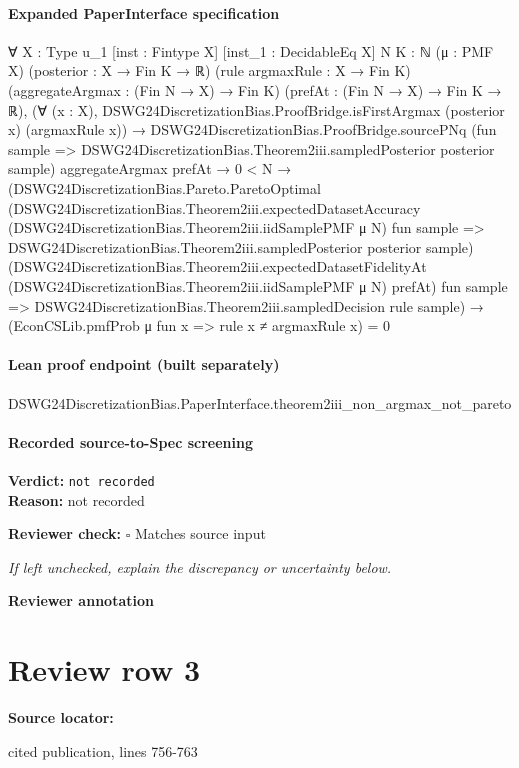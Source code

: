\documentclass[10pt]{article}
\newcommand{\reviewerbox}{%
  \par\noindent\fbox{\parbox{0.96\linewidth}{\rule{0pt}{0.38in}}}\par
}
\newcommand{\reviewmatch}[1]{%
  \par\noindent\textbf{Reviewer check:} $\square$\; #1\par
  \noindent\emph{If left unchecked, explain the discrepancy or uncertainty below.}\par
}
\begin{document}
\paragraph{Expanded PaperInterface specification}
\begin{ReviewVerbatim}
∀ {X : Type u_1} [inst : Fintype X] [inst_1 : DecidableEq X] {N K : ℕ} (μ : PMF X) (posterior : X → Fin K → ℝ)
  (rule argmaxRule : X → Fin K) (aggregateArgmax : (Fin N → X) → Fin K) (prefAt : (Fin N → X) → Fin K → ℝ),
  (∀ (x : X), DSWG24DiscretizationBias.ProofBridge.isFirstArgmax (posterior x) (argmaxRule x)) →
    DSWG24DiscretizationBias.ProofBridge.sourcePNq
        (fun sample => DSWG24DiscretizationBias.Theorem2iii.sampledPosterior posterior sample) aggregateArgmax prefAt →
      0 < N →
        (DSWG24DiscretizationBias.Pareto.ParetoOptimal
            (DSWG24DiscretizationBias.Theorem2iii.expectedDatasetAccuracy
              (DSWG24DiscretizationBias.Theorem2iii.iidSamplePMF μ N) fun sample =>
              DSWG24DiscretizationBias.Theorem2iii.sampledPosterior posterior sample)
            (DSWG24DiscretizationBias.Theorem2iii.expectedDatasetFidelityAt
              (DSWG24DiscretizationBias.Theorem2iii.iidSamplePMF μ N) prefAt)
            fun sample => DSWG24DiscretizationBias.Theorem2iii.sampledDecision rule sample) →
          (EconCSLib.pmfProb μ fun x => rule x ≠ argmaxRule x) = 0
\end{ReviewVerbatim}

\paragraph{Lean proof endpoint (built separately)}\begin{ReviewVerbatim}
DSWG24DiscretizationBias.PaperInterface.theorem2iii_non_argmax_not_pareto
\end{ReviewVerbatim}

\paragraph{Recorded source-to-Spec screening}
\textbf{Verdict:} \texttt{not recorded}
\\
\textbf{Reason:} not recorded
\reviewmatch{Matches source input}
\noindent\textbf{Reviewer annotation}\par
\reviewerbox
\clearpage
\hypertarget{source-claim-9ffb824c48c4cf97}{}
\section*{Review row 3}
\textbf{Source locator:} {\footnotesize\raggedright cited publication, lines 756-\allowbreak{}763\par}
\end{document}
